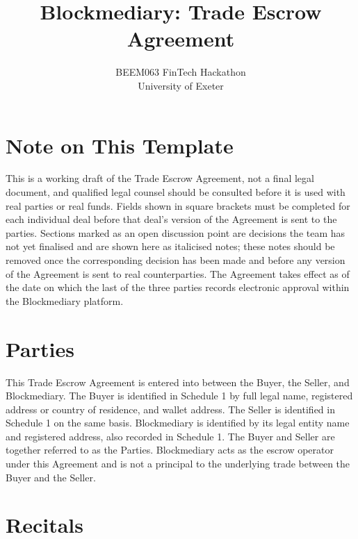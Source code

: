 \documentclass[12pt, a4paper]{article}
\title{\textbf{Blockmediary: Trade Escrow Agreement}}
\author{}
\date{BEEM063 FinTech Hackathon \\ University of Exeter}
\begin{document}
\maketitle
\newpage

\section*{Note on This Template}

This is a working draft of the Trade Escrow Agreement, not a final legal document, and
qualified legal counsel should be consulted before it is used with real parties or real
funds. Fields shown in square brackets must be completed for each individual deal before
that deal's version of the Agreement is sent to the parties. Sections marked as an open
discussion point are decisions the team has not yet finalised and are shown here as
italicised notes; these notes should be removed once the corresponding decision has been
made and before any version of the Agreement is sent to real counterparties. The Agreement
takes effect as of the date on which the last of the three parties records electronic
approval within the Blockmediary platform.

\section*{Parties}

This Trade Escrow Agreement is entered into between the Buyer, the Seller, and
Blockmediary. The Buyer is identified in Schedule 1 by full legal name, registered address
or country of residence, and wallet address. The Seller is identified in Schedule 1 on the
same basis. Blockmediary is identified by its legal entity name and registered address,
also recorded in Schedule 1. The Buyer and Seller are together referred to as the Parties.
Blockmediary acts as the escrow operator under this Agreement and is not a principal to
the underlying trade between the Buyer and the Seller.

\section*{Recitals}
\end{document}
